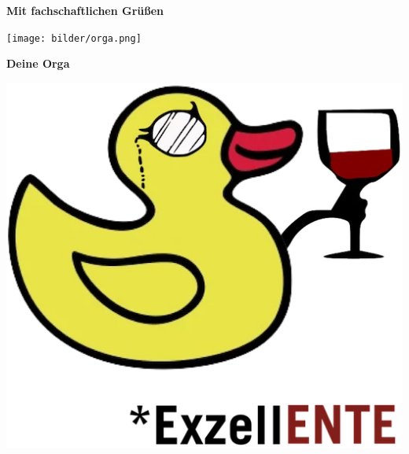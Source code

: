 \documentclass{scrbook}
\begin{document}
\null
\newpage




\newpage


  \vspace*{2cm}

  \Huge \textbf{Mit fachschaftlichen Grüßen}

  \vspace{1.5cm}

  \texttt{[image: bilder/orga.png]}

  \vspace{1cm}

  \begin{minipage}{0.6\textwidth}
    \hspace*{0.5cm} \Huge \textbf{Deine Orga}
  \end{minipage}
  \hfill
  \begin{minipage}{0.3\textwidth}
    \includegraphics[width=2´3cm]{bilder/exzellent.png}
  \end{minipage}
\end{document}
